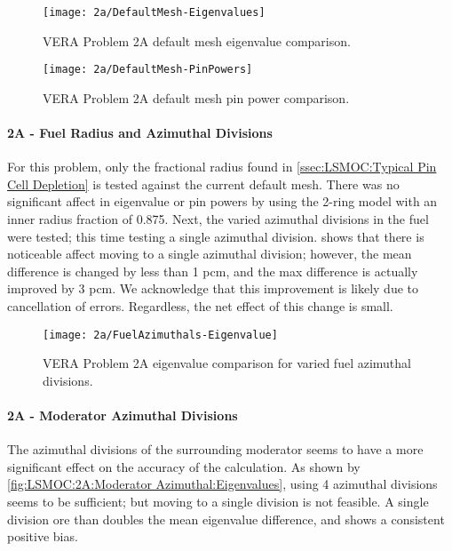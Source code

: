 {{{{{          \begin{figure}
            \centering
            \texttt{[image: 2a/DefaultMesh-Eigenvalues]}
            \caption{VERA Problem 2A default mesh eigenvalue comparison. \label{fig:LSMOC:2A:Default Mesh:Eigenvalues}}
          \end{figure}
          \begin{figure}
            \centering
            \texttt{[image: 2a/DefaultMesh-PinPowers]}
            \caption{VERA Problem 2A default mesh pin power comparison. \label{fig:LSMOC:2A:Default Mesh:PinPowers}}
          \end{figure}
        }
        \paragraph{2A - Fuel Radius and Azimuthal Divisions}{
          For this problem, only the fractional radius found in \cref{ssec:LSMOC:Typical Pin Cell Depletion} is tested against the current default mesh.
          There was no significant affect in eigenvalue or pin powers by using the 2-ring model with an inner radius fraction of 0.875.
          Next, the varied azimuthal divisions in the fuel were tested; this time testing a single azimuthal division.
           shows that there is noticeable affect moving to a single azimuthal division;
            however, the mean difference is changed by less than 1 \ac{pcm}, and the max difference is actually improved by 3 \ac{pcm}.
          We acknowledge that this improvement is likely due to cancellation of errors. Regardless, the net effect of this change is small.

          \begin{figure}
            \centering
            \texttt{[image: 2a/FuelAzimuthals-Eigenvalue]}
            \caption{VERA Problem 2A eigenvalue comparison for varied fuel azimuthal divisions. \label{fig:LSMOC:2A:Fuel Azimuthals:Eigenvalues}}
          \end{figure}
        }
        \paragraph{2A - Moderator Azimuthal Divisions}{
          The azimuthal divisions of the surrounding moderator seems to have a more significant effect on the accuracy of the calculation.
          As shown by \cref{fig:LSMOC:2A:Moderator Azimuthal:Eigenvalues}, using 4 azimuthal divisions seems to be sufficient; but moving to a single division is not feasible.
          A single division ore than doubles the mean eigenvalue difference, and shows a consistent positive bias.

}}}}}
